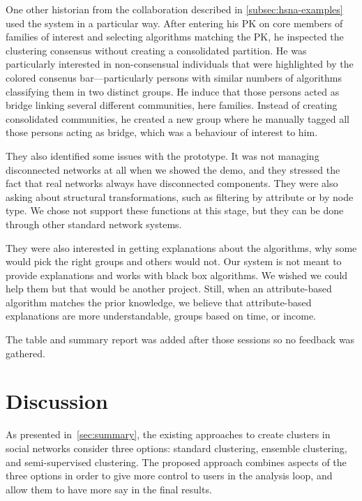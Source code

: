 One other historian from the collaboration \pascal described in \autoref{subsec:hsna-examples} used the system in a particular way. After entering his PK on core members of families of interest and selecting algorithms matching the PK, he inspected the clustering consensus without creating a consolidated partition. He was particularly interested in non-consensual individuals that were highlighted by the colored consenus bar---particularly persons with similar numbers of algorithms classifying them in two distinct groups.
He induce that those persons acted as bridge linking several different communities, here families.
Instead of creating consolidated communities, he created a new group where he manually tagged all those persons acting as bridge, which was a behaviour of interest to him.

They also identified some issues with the prototype. It was not managing disconnected networks at all when we showed the demo, and they stressed the fact that real networks always have disconnected components. They were also asking about structural transformations, such as filtering by attribute or by node type. We chose not support these functions at this stage, but they can be done through other standard network systems.

They were also interested in getting explanations about the algorithms, why some would pick the right groups and others would not. Our system is not meant to provide explanations and works with black box algorithms. We wished we could help them but that would be another project. Still, when an attribute-based algorithm matches the prior knowledge, we believe that attribute-based explanations are more understandable, \eg groups based on time, or income.

The table and summary report was added after those sessions so no feedback was gathered.


\section{Discussion}

As presented in~\autoref{sec:summary}, the existing approaches to create clusters in social networks consider three options: standard clustering, ensemble clustering, and semi-supervised clustering.
The proposed \pkclustering approach combines aspects of the three options in order to give more control to users in the analysis loop, and allow them to have more say in the final results.

